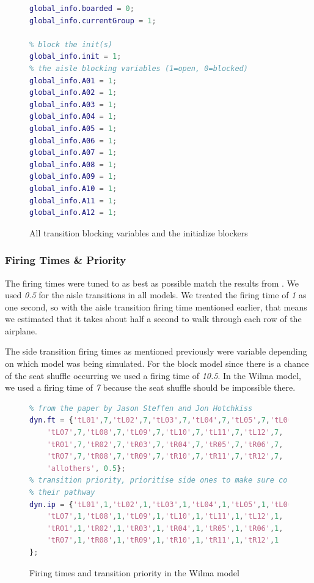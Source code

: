 \documentclass[english]{article}
\begin{document}
\begin{figure}[H]
    \centering
\begin{lstlisting}[language=MATLAB]
global_info.boarded = 0;
global_info.currentGroup = 1;

% block the init(s)
global_info.init = 1;
% the aisle blocking variables (1=open, 0=blocked)
global_info.A01 = 1;
global_info.A02 = 1;
global_info.A03 = 1;
global_info.A04 = 1;
global_info.A05 = 1;
global_info.A06 = 1;
global_info.A07 = 1;
global_info.A08 = 1;
global_info.A09 = 1;
global_info.A10 = 1;
global_info.A11 = 1;
global_info.A12 = 1;
\end{lstlisting}
    \caption{All transition blocking variables and the initialize blockers}
    \label{fig:tblock}
\end{figure}


\subsubsection{Firing Times \& Priority}
The firing times were tuned to as best as possible match the results from \cite{STEFFEN201264}. We used \emph{0.5} for the aisle transitions in all models. We treated the firing time of \emph{1} as one second, so with the aisle transition firing time mentioned earlier, that means we estimated that it takes about half a second to walk through each row of the airplane. 

The side transition firing times as mentioned previously were variable depending on which model was being simulated. For the block model since there is a chance of the seat shuffle occurring we used a firing time of \emph{10.5}. In the Wilma model, we used a firing time of \emph{7} because the seat shuffle should be impossible there.

\begin{figure}[H]
    \centering
\begin{lstlisting}[language=MATLAB]
% firing times, Have been tweaked to attempt to closely match the pre-existing results
% from the paper by Jason Steffen and Jon Hotchkiss
dyn.ft = {'tL01',7,'tL02',7,'tL03',7,'tL04',7,'tL05',7,'tL06',7, ...
    'tL07',7,'tL08',7,'tL09',7,'tL10',7,'tL11',7,'tL12',7, ...
    'tR01',7,'tR02',7,'tR03',7,'tR04',7,'tR05',7,'tR06',7, ...
    'tR07',7,'tR08',7,'tR09',7,'tR10',7,'tR11',7,'tR12',7, ...
    'allothers', 0.5};
% transition priority, prioritise side ones to make sure colours go down
% their pathway
dyn.ip = {'tL01',1,'tL02',1,'tL03',1,'tL04',1,'tL05',1,'tL06',1, ...
    'tL07',1,'tL08',1,'tL09',1,'tL10',1,'tL11',1,'tL12',1, ...
    'tR01',1,'tR02',1,'tR03',1,'tR04',1,'tR05',1,'tR06',1, ...
    'tR07',1,'tR08',1,'tR09',1,'tR10',1,'tR11',1,'tR12',1
};
\end{lstlisting}
    \caption{Firing times and transition priority in the Wilma model}
    \label{fig:ft_ip}
\end{figure}
\end{document}

